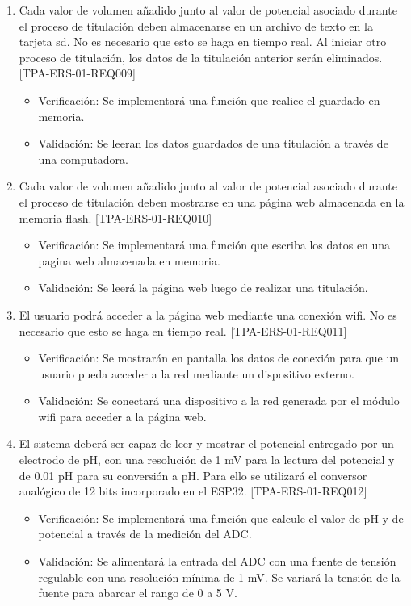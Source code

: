 \documentclass[11pt]{charter}
\begin{document}
\begin{enumerate}
\begin{enumerate}
	\item Cada valor de volumen añadido junto al valor de potencial asociado durante el proceso de titulación deben almacenarse en un archivo de texto en la tarjeta sd. No es necesario que esto se haga en tiempo real. Al iniciar otro proceso de titulación, los datos de la titulación anterior serán eliminados. [TPA-ERS-01-REQ009]
	\begin{itemize}
\item Verificación: Se implementará una función que realice el guardado en memoria.\\
\item Validación: Se leeran los datos guardados de una titulación a través de una computadora.\\
\end{itemize}

	\item Cada valor de volumen añadido junto al valor de potencial asociado durante el proceso de titulación deben mostrarse en una página web almacenada en la memoria flash. [TPA-ERS-01-REQ010]
	\begin{itemize}
\item Verificación: Se implementará una función que escriba los datos en una pagina web almacenada en memoria.\\
\item Validación: Se leerá la página web luego de realizar una titulación.\\
\end{itemize}

	\item El usuario podrá acceder a la página web mediante una conexión wifi. No es necesario que esto se haga en tiempo real. [TPA-ERS-01-REQ011]
	\begin{itemize}
\item Verificación: Se mostrarán en pantalla los datos de conexión para que un usuario pueda acceder a la red mediante un dispositivo externo.\\
\item Validación: Se conectará una dispositivo a la red generada por el módulo wifi para acceder a la página web.\\
\end{itemize}

	\item El sistema deberá ser capaz de leer y mostrar el potencial entregado por un electrodo de pH, con una resolución de 1 mV para la lectura del potencial y de 0.01 pH para su conversión a pH. Para ello se utilizará el conversor analógico de 12 bits incorporado en el ESP32. [TPA-ERS-01-REQ012]
	\begin{itemize}
\item Verificación: Se implementará una función que calcule el valor de pH y de potencial a través de la medición del ADC.\\
\item Validación: Se alimentará la entrada del ADC con una fuente de tensión regulable con una resolución mínima de 1 mV. Se variará la tensión de la fuente para abarcar el rango de 0 a 5 V.\\
\end{itemize}


\end{enumerate}
\end{enumerate}
\end{document}

